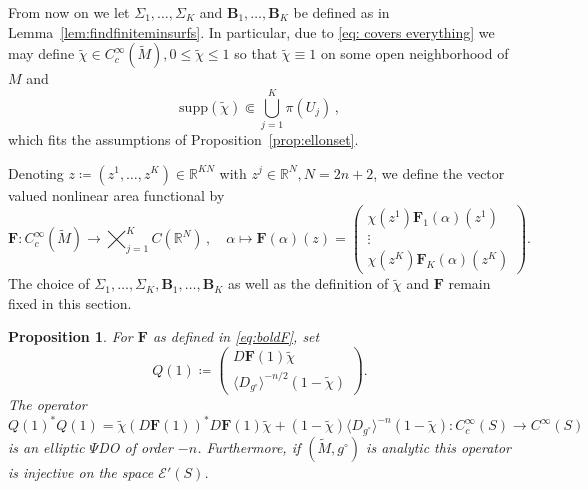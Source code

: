 \documentclass[11pt]{amsart}
\newtheorem{Proposition}[Theorem]{Proposition}
\theoremstyle{definition}
\numberwithin{equation}{section}
\newcommand{\mR}{\mathbb{R}}                    %
\newcommand{\supp}{\mathrm{supp}}
\newcommand{\BB}{\mathbf B}
\begin{document}
From now on we let $\Sigma_1,\dots,\Sigma_K$ and $\BB_1,\dots,\BB_K$ be defined as in Lemma~\ref{lem:findfiniteminsurfs}. In particular, due to \eqref{eq: covers everything} we may define $\tilde{\chi} \in C_c^\infty(\widetilde{M}), 0\leq \tilde{\chi}\leq 1$ so that $\tilde{\chi} \equiv 1$ on some open neighborhood of $M$ and
\begin{equation}\label{eq:supptdchi}
		\supp (\tilde{\chi}) \Subset \bigcup_{j=1}^K \pi(U_j)\,,
\end{equation}
which fits the assumptions of Proposition~\ref{prop:ellonset}.


Denoting $z \coloneqq (z^1,\dots,z^K) \in \mR^{KN}$ with $z^j \in \mR^{N}, N=2n+2$, we  %
define the vector valued nonlinear area functional by
\begin{equation}\label{eq:boldF}
	\mathbf{F} \colon  C_c^\infty(\widetilde{M}) \to \bigtimes_{j=1}^K C(\mR^{N})\,,\quad \alpha\mapsto \mathbf{F}(\alpha)(z) = \begin{pmatrix} \chi({z^1})\mathbf{F}_1(\alpha)(z^1) \\ \vdots \\  \chi({z^K})\mathbf{F}_K(\alpha)(z^K)\end{pmatrix}.%
\end{equation}
The choice of $\Sigma_1,\dots,\Sigma_K, \BB_1,\dots,\BB_K$ as well as the definition of $\tilde\chi$ and $\mathbf{F}$ remain fixed in this section.
\begin{Proposition}\label{prop:injellop}
	For $\mathbf{F}$ as defined in \eqref{eq:boldF}, set %
	\[
		Q(1) \coloneqq  \begin{pmatrix} D\mathbf{F}(1)\tilde{\chi} \\ \langle D_{g^\circ}\rangle^{-n/2}(1-\tilde{\chi}) \end{pmatrix}.
	\]
	The operator
	\begin{equation}\label{eq:ellop}
		Q(1)^\ast Q(1) = \tilde{\chi}(D\mathbf{F}(1))^\ast D\mathbf{F}(1)\tilde{\chi} + (1-\tilde{\chi})\langle D_{g^\circ}\rangle^{-n} (1-\tilde{\chi})  \colon C_c^\infty(S) \to C^\infty(S)
	\end{equation}
	is an elliptic $\Psi$DO of order $-n$. Furthermore, if $(\widetilde{M}, g^\circ)$ is analytic this operator is injective on the space $\mathcal{E}'(S)$.
\end{Proposition}
\end{document}
